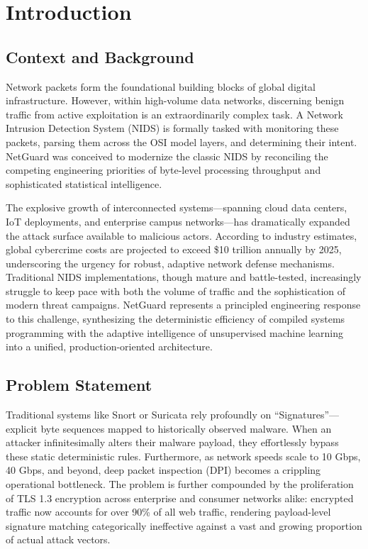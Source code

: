 \documentclass[conference]{IEEEtran}
\begin{document}
\section{Introduction}

\subsection{Context and Background}
Network packets form the foundational building blocks of global digital infrastructure. However, within high-volume data networks, discerning benign traffic from active exploitation is an extraordinarily complex task. A Network Intrusion Detection System (NIDS) is formally tasked with monitoring these packets, parsing them across the OSI model layers, and determining their intent. NetGuard was conceived to modernize the classic NIDS by reconciling the competing engineering priorities of byte-level processing throughput and sophisticated statistical intelligence.

The explosive growth of interconnected systems---spanning cloud data centers, IoT deployments, and enterprise campus networks---has dramatically expanded the attack surface available to malicious actors. According to industry estimates, global cybercrime costs are projected to exceed \$10 trillion annually by 2025, underscoring the urgency for robust, adaptive network defense mechanisms. Traditional NIDS implementations, though mature and battle-tested, increasingly struggle to keep pace with both the volume of traffic and the sophistication of modern threat campaigns. NetGuard represents a principled engineering response to this challenge, synthesizing the deterministic efficiency of compiled systems programming with the adaptive intelligence of unsupervised machine learning into a unified, production-oriented architecture.

\subsection{Problem Statement}
Traditional systems like Snort or Suricata rely profoundly on ``Signatures''---explicit byte sequences mapped to historically observed malware. When an attacker infinitesimally alters their malware payload, they effortlessly bypass these static deterministic rules. Furthermore, as network speeds scale to 10 Gbps, 40 Gbps, and beyond, deep packet inspection (DPI) becomes a crippling operational bottleneck. The problem is further compounded by the proliferation of TLS 1.3 encryption across enterprise and consumer networks alike: encrypted traffic now accounts for over 90\% of all web traffic, rendering payload-level signature matching categorically ineffective against a vast and growing proportion of actual attack vectors.
\end{document}
